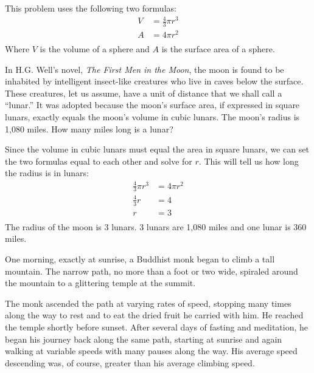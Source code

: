 \documentclass[letterpaper, landscape]{exam}
\begin{document}
  \begin{questions}

    \question{}
      This problem uses the following two formulas:
      \begin{align*}
        V & = \frac{4}{3} \pi r^3 \\
        A & = 4 \pi r^2 \\
      \end{align*}
      Where $V$ is the volume of a sphere and $A$ is the surface area of a sphere.

      In H.G. Well's novel, {\em The First Men in the Moon}, the moon is found to be inhabited by intelligent insect-like
      creatures who live in caves below the surface.  These creatures, let us assume, have a unit of distance that we
      shall call a ``lunar.''  It was adopted because the moon's surface area, if expressed in square lunars, exactly
      equals the moon's volume in cubic lunars.  The moon's radius is 1,080 miles.  How many miles long is a lunar?

      \begin{solution}
        Since the volume in cubic lunars must equal the area in square lunars, we can set the two formulas equal to each
        other and solve for $r$.  This will tell us how long the radius is in lunars:
        \begin{align*}
          \frac{4}{3} \pi r^3 & = 4 \pi r^2 \\
          \frac{4}{3} r       & = 4 \\
          r                   & = 3 \\
        \end{align*}
        The radius of the moon is 3 lunars. 3 lunars are 1,080 miles and one lunar is 360 miles.
      \end{solution}


    \question{}

      One morning, exactly at sunrise, a Buddhist monk began to climb a tall mountain.  The narrow path, no more than a
      foot or two wide, spiraled around the mountain to a glittering temple at the summit.

      The monk ascended the path at varying rates of speed, stopping many times along the way to rest and to eat the dried
      fruit he carried with him.  He reached the temple shortly before sunset.  After several days of fasting and
      meditation, he began his journey back along the same path, starting at sunrise and again walking at variable speeds
      with many pauses along the way.  His average speed descending was, of course, greater than his average climbing
      speed.


\end{questions}
\end{document}
